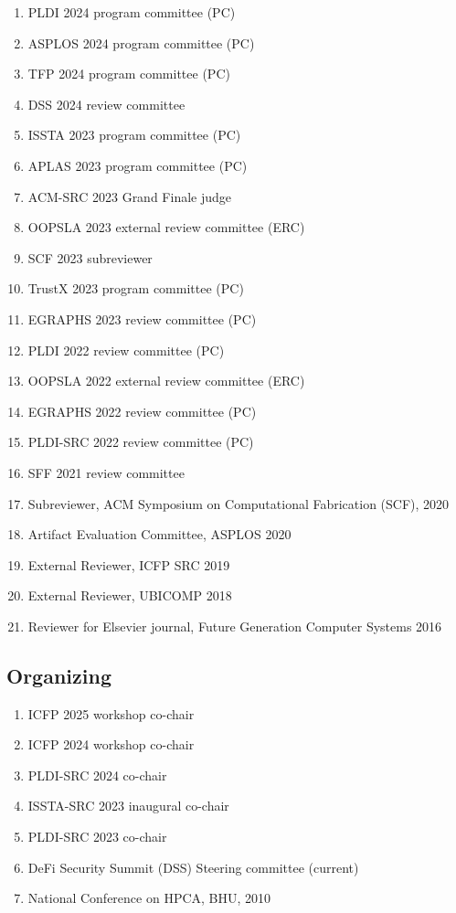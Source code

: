 \documentclass[margin, 10pt]{res} %
\begin{document}
\begin{resume}
\begin{enumerate}[itemsep=-2pt]
\item PLDI 2024 program committee (PC)
\item ASPLOS 2024 program committee (PC)
\item TFP 2024 program committee (PC)
\item DSS 2024 review committee
\item ISSTA 2023 program committee (PC)
\item APLAS 2023 program committee (PC)
\item ACM-SRC 2023 Grand Finale judge
\item OOPSLA 2023 external review committee (ERC)
\item SCF 2023 subreviewer
\item TrustX 2023 program committee (PC)
\item EGRAPHS 2023 review committee (PC)
\item PLDI 2022 review committee (PC)
\item OOPSLA 2022 external review committee (ERC)
\item EGRAPHS 2022 review committee (PC)
\item PLDI-SRC 2022 review committee (PC)
\item SFF 2021 review committee
\item Subreviewer, ACM Symposium on Computational Fabrication (SCF), 2020
\item Artifact Evaluation Committee, ASPLOS 2020
\item External Reviewer, ICFP SRC 2019
\item External Reviewer, UBICOMP 2018
\item Reviewer for Elsevier journal, Future Generation Computer Systems 2016
\end{enumerate}

\subsection{Organizing}
\begin{enumerate}[itemsep=-2pt]
  \item ICFP 2025 workshop co-chair
  \item ICFP 2024 workshop co-chair
  \item PLDI-SRC 2024 co-chair
  \item ISSTA-SRC 2023 inaugural co-chair
  \item PLDI-SRC 2023 co-chair
  \item DeFi Security Summit (DSS) Steering committee (current)
  \item National Conference on HPCA, BHU, 2010
\end{enumerate}


\end{resume}
\end{document}

